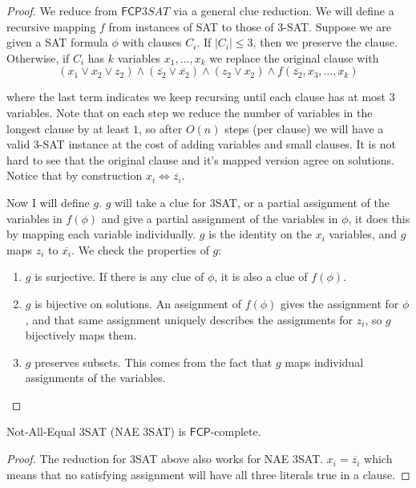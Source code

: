 \documentclass[runningheads,a4paper]{llncs}
\begin{document}
\begin{proof}
We reduce from $\mathsf{FCP} 3SAT$ via a general clue reduction. We will define a recursive mapping $f$ from instances of SAT to those of 3-SAT. Suppose we are given a SAT formula $\phi$ with clauses $C_i$. If $|C_i| \leq 3$, then we preserve the clause. Otherwise, if $C_i$ has $k$ variables $x_1,...,x_k$ we replace the original clause with 
\[ 
(x_1 \vee x_2 \vee z_2) \wedge (\overline{z_2} \vee \overline{x_2}) \wedge (z_2 \vee x_2) \wedge f(\overline{z_2}, x_3, ..., x_k) 
\]

where the last term indicates we keep recursing until each clause has at most $3$ variables. Note that on each step we reduce the number of variables in the longest clause by at least $1$, so after $O(n)$ steps (per clause) we will have a valid 3-SAT instance at the cost of adding variables and small clauses. It is not hard to see that the original clause and it's mapped version agree on solutions. Notice that by construction $x_i \iff \overline{z_i}$. 

Now I will define $g$. $g$ will take a clue for 3SAT, or a partial assignment of the variables in $f(\phi)$ and give a partial assignment of the variables in $\phi$, it does this by mapping each variable individually. $g$ is the identity on the $x_i$ variables, and $g$ maps $z_i$ to $\overline{x_i}$. We check the properties of $g$:
\begin{enumerate}
\item $g$ is surjective. If there is any clue of $\phi$, it is also a clue of $f(\phi)$. 
\item $g$ is bijective on solutions. An assignment of $f(\phi)$ gives the assignment for $\phi$, and that same assignment uniquely describes the assignments for $z_i$, so $g$ bijectively maps them.
\item $g$ preserves subsets. This comes from the fact that $g$ maps individual assignments of the variables. 
\end{enumerate}
\end{proof}

\begin{corollary}
Not-All-Equal 3SAT (NAE 3SAT) is $\mathsf{FCP}$-complete.
\end{corollary}

\begin{proof}
The reduction for 3SAT above also works for NAE 3SAT. $x_i = \overline{z_i}$ which means that no satisfying assignment will have all three literals true in a clause. 
\end{proof}
\end{document}
